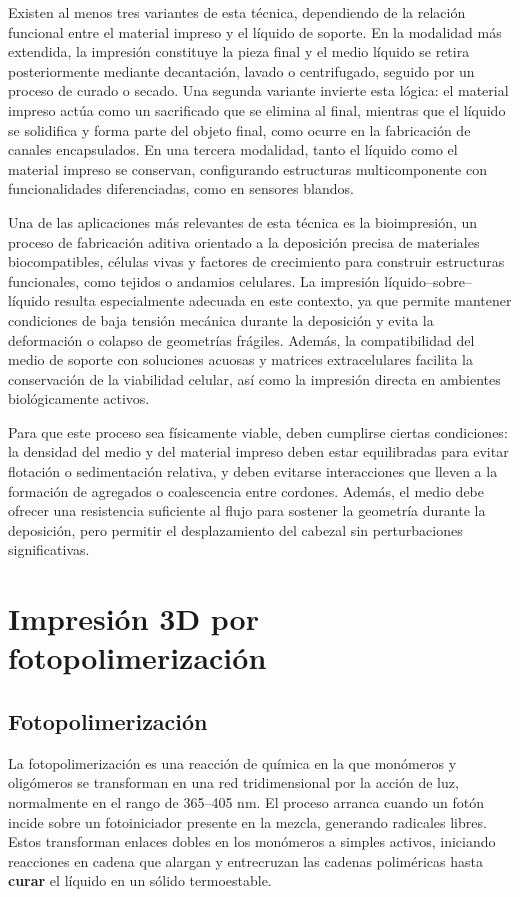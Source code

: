 Existen al menos tres variantes de esta técnica, dependiendo de la relación funcional entre el material impreso y el líquido de soporte. En la modalidad más extendida, la impresión constituye la pieza final y el medio líquido se retira posteriormente mediante decantación, lavado o centrifugado, seguido por un proceso de curado o secado. Una segunda variante invierte esta lógica: el material impreso actúa como un sacrificado que se elimina al final, mientras que el líquido se solidifica y forma parte del objeto final, como ocurre en la fabricación de canales encapsulados. En una tercera modalidad, tanto el líquido como el material impreso se conservan, configurando estructuras multicomponente con funcionalidades diferenciadas, como en sensores blandos.

Una de las aplicaciones más relevantes de esta técnica es la bioimpresión, un proceso de fabricación aditiva orientado a la deposición precisa de materiales biocompatibles, células vivas y factores de crecimiento para construir estructuras funcionales, como tejidos o andamios celulares. La impresión líquido–sobre–líquido resulta especialmente adecuada en este contexto, ya que permite mantener condiciones de baja tensión mecánica durante la deposición y evita la deformación o colapso de geometrías frágiles. Además, la compatibilidad del medio de soporte con soluciones acuosas y matrices extracelulares facilita la conservación de la viabilidad celular, así como la impresión directa en ambientes biológicamente activos.

Para que este proceso sea físicamente viable, deben cumplirse ciertas condiciones: la densidad del medio y del material impreso deben estar equilibradas para evitar flotación o sedimentación relativa, y deben evitarse interacciones que lleven a la formación de agregados o coalescencia entre cordones. Además, el medio debe ofrecer una resistencia suficiente al flujo para sostener la geometría durante la deposición, pero permitir el desplazamiento del cabezal sin perturbaciones significativas.

 
\section{Impresión 3D por fotopolimerización}

\subsection{Fotopolimerización}

La fotopolimerización es una reacción de química en la que monómeros y oligómeros se transforman en una red tridimensional por la acción de luz, normalmente en el rango de 365–405 nm. El proceso arranca cuando un fotón incide sobre un fotoiniciador presente en la mezcla, generando radicales libres. Estos transforman enlaces dobles en los monómeros a simples activos, iniciando reacciones en cadena que alargan y entrecruzan las cadenas poliméricas hasta \textbf{curar} el líquido en un sólido termoestable.

